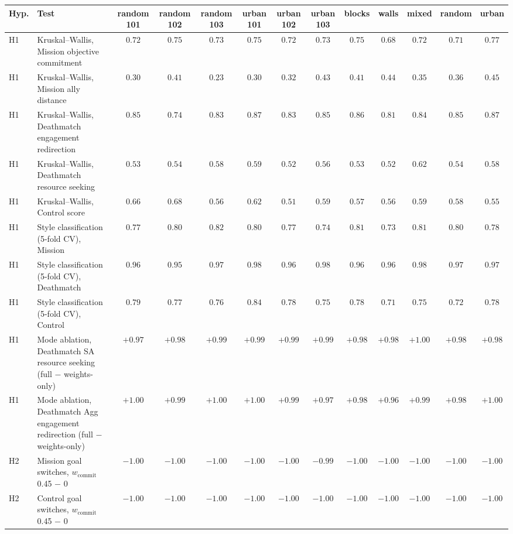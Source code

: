 \begin{tabular}{llccccccccccc}
\toprule
Hyp. & Test & random 101 & random 102 & random 103 & urban 101 & urban 102 & urban 103 & blocks & walls & mixed & random & urban \\
\midrule
H1 & Kruskal--Wallis, Mission objective commitment & $0.72$ & $0.75$ & $0.73$ & $0.75$ & $0.72$ & $0.73$ & $0.75$ & $0.68$ & $0.72$ & $0.71$ & $0.77$ \\
H1 & Kruskal--Wallis, Mission ally distance & $0.30$ & $0.41$ & $0.23$ & $0.30$ & $0.32$ & $0.43$ & $0.41$ & $0.44$ & $0.35$ & $0.36$ & $0.45$ \\
H1 & Kruskal--Wallis, Deathmatch engagement redirection & $0.85$ & $0.74$ & $0.83$ & $0.87$ & $0.83$ & $0.85$ & $0.86$ & $0.81$ & $0.84$ & $0.85$ & $0.87$ \\
H1 & Kruskal--Wallis, Deathmatch resource seeking & $0.53$ & $0.54$ & $0.58$ & $0.59$ & $0.52$ & $0.56$ & $0.53$ & $0.52$ & $0.62$ & $0.54$ & $0.58$ \\
H1 & Kruskal--Wallis, Control score & $0.66$ & $0.68$ & $0.56$ & $0.62$ & $0.51$ & $0.59$ & $0.57$ & $0.56$ & $0.59$ & $0.58$ & $0.55$ \\
H1 & Style classification (5-fold CV), Mission & $0.77$ & $0.80$ & $0.82$ & $0.80$ & $0.77$ & $0.74$ & $0.81$ & $0.73$ & $0.81$ & $0.80$ & $0.78$ \\
H1 & Style classification (5-fold CV), Deathmatch & $0.96$ & $0.95$ & $0.97$ & $0.98$ & $0.96$ & $0.98$ & $0.96$ & $0.96$ & $0.98$ & $0.97$ & $0.97$ \\
H1 & Style classification (5-fold CV), Control & $0.79$ & $0.77$ & $0.76$ & $0.84$ & $0.78$ & $0.75$ & $0.78$ & $0.71$ & $0.75$ & $0.72$ & $0.78$ \\
H1 & Mode ablation, Deathmatch SA resource seeking (full $-$ weights-only) & $+0.97$ & $+0.98$ & $+0.99$ & $+0.99$ & $+0.99$ & $+0.99$ & $+0.98$ & $+0.98$ & $+1.00$ & $+0.98$ & $+0.98$ \\
H1 & Mode ablation, Deathmatch Agg engagement redirection (full $-$ weights-only) & $+1.00$ & $+0.99$ & $+1.00$ & $+1.00$ & $+0.99$ & $+0.97$ & $+0.98$ & $+0.96$ & $+0.99$ & $+0.98$ & $+1.00$ \\
H2 & Mission goal switches, $w_{\mathrm{commit}}$ 0.45 $-$ 0 & $-1.00$ & $-1.00$ & $-1.00$ & $-1.00$ & $-1.00$ & $-0.99$ & $-1.00$ & $-1.00$ & $-1.00$ & $-1.00$ & $-1.00$ \\
H2 & Control goal switches, $w_{\mathrm{commit}}$ 0.45 $-$ 0 & $-1.00$ & $-1.00$ & $-1.00$ & $-1.00$ & $-1.00$ & $-1.00$ & $-1.00$ & $-1.00$ & $-1.00$ & $-1.00$ & $-1.00$ \\

\end{tabular}
